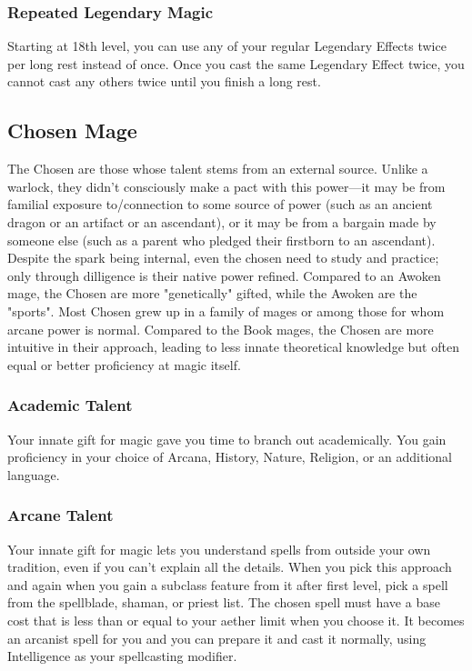 \subsubsection{Repeated Legendary Magic}
Starting at 18th level, you can use any of your regular Legendary Effects twice per long rest instead of once. Once you cast the same Legendary Effect twice, you cannot cast any others twice until you finish a long rest.

\subsection{Chosen Mage}
The Chosen are those whose talent stems from an external source. Unlike a warlock, they didn't consciously make a pact with this power---it may be from familial exposure to/connection to some source of power (such as an ancient dragon or an artifact or an ascendant), or it may be from a bargain made by someone else (such as a parent who pledged their firstborn to an ascendant). Despite the spark being internal, even the chosen need to study and practice; only through dilligence is their native power refined. Compared to an Awoken mage, the Chosen are more "genetically" gifted, while the Awoken are the "sports". Most Chosen grew up in a family of mages or among those for whom arcane power is normal. Compared to the Book mages, the Chosen are more intuitive in their approach, leading to less innate theoretical knowledge but often equal or better proficiency at magic itself.

\subsubsection{Academic Talent}
Your innate gift for magic gave you time to branch out academically. You gain proficiency in your choice of Arcana, History, Nature, Religion, or an additional language.

\subsubsection{Arcane Talent}
Your innate gift for magic lets you understand spells from outside your own tradition, even if you can't explain all the details. When you pick this approach and again when you gain a subclass feature from it after first level, pick a spell from the spellblade, shaman, or priest list. The chosen spell must have a base cost that is less than or equal to your aether limit when you choose it. It becomes an arcanist spell for you and you can prepare it and cast it normally, using Intelligence as your spellcasting modifier.

